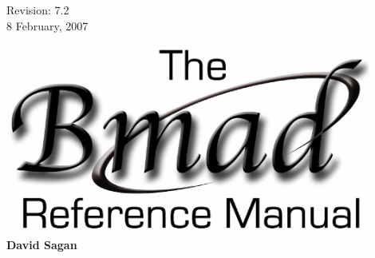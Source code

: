 \thispagestyle{empty}

\begin{flushright}
\large
  Revision: 7.2 \\
  8 February, 2007 \\
\end{flushright}

\vfill

{
\begin{center}
\includegraphics[width=12cm]{bmad-ref-manual.eps} \\
\vskip 0.3in
\huge\bf David Sagan
\end{center}
}

\vfill
\break
